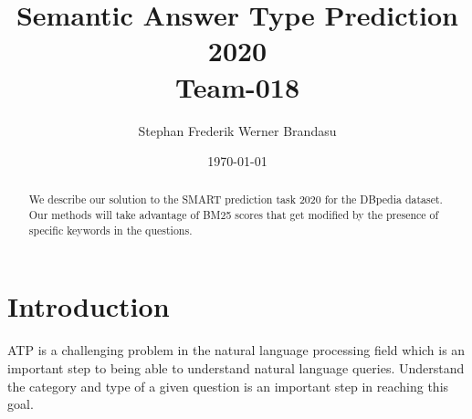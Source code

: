 \documentclass[sigconf]{acmart}
\begin{document}

\title{%
  Semantic Answer Type Prediction 2020 \\
  \large Team-018}

\author{Stephan Frederik Werner Brandasu}

\date{\today}



\begin{abstract}
We describe our solution to the \gls{SMART} prediction task 2020 for the DBpedia dataset. Our methods will take advantage of BM25 scores that get modified by the presence of specific keywords in the questions.
\end{abstract}


\renewcommand\footnotetextcopyrightpermission[1]{}
\pagestyle{plain}

\maketitle



\section{Introduction}
\gls{ATP} is a challenging problem in the natural language processing field which is an important step to being able to understand natural language queries. Understand the category and type of a given question is an important step in reaching this goal.
\end{document}
